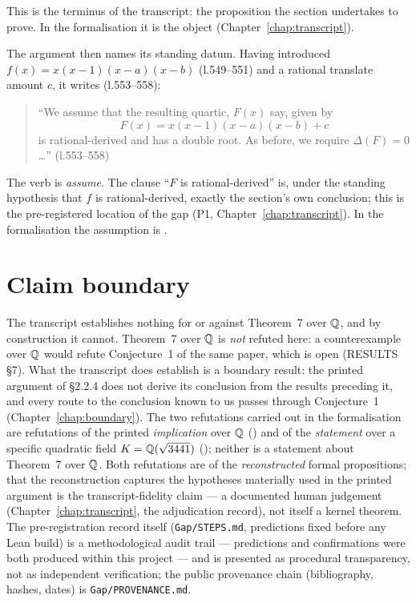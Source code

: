 This is the terminus of the transcript: the proposition the section undertakes to
prove.  In the formalisation it is the object 
(Chapter~\ref{chap:transcript}).

The argument then names its standing datum.  Having introduced
$f(x)=x(x-1)(x-a)(x-b)$ (l.549--551) and a rational translate amount $c$, it writes
(l.553--558):

\begin{quote}
``We assume that the resulting quartic, $F(x)$ say, given by
\[
F(x) = x(x-1)(x-a)(x-b) + c \tag{4}
\]
is rational-derived and has a double root. As before, we require $\Delta(F)=0$\dots''
\hfill (l.553--558)
\end{quote}

The verb is \emph{assume}.  The clause ``$F$ is rational-derived'' is, under the
standing hypothesis that $f$ is rational-derived, exactly the section's own
conclusion; this is the pre-registered location of the gap
(P1, Chapter~\ref{chap:transcript}).  In the formalisation the assumption is
.

\section{Claim boundary}

The transcript establishes nothing for or against Theorem~7 over $\mathbb{Q}$, and by
construction it cannot.  Theorem~7 over $\mathbb{Q}$ is \emph{not} refuted here: a
counterexample over $\mathbb{Q}$ would refute Conjecture~1 of the same paper, which is open
(RESULTS \S7).  What the transcript does establish is a boundary result: the printed
argument of \S2.2.4 does not derive its conclusion from the results preceding it, and
every route to the conclusion known to us passes through Conjecture~1
(Chapter~\ref{chap:boundary}).  The two refutations carried out in the formalisation
are refutations of the printed \emph{implication} over $\mathbb{Q}$
() and of the \emph{statement} over a specific
quadratic field $K=\mathbb{Q}(\sqrt{3441})$ (); neither
is a statement about Theorem~7 over $\mathbb{Q}$.  Both refutations are of the
\emph{reconstructed} formal propositions; that the reconstruction captures the hypotheses
materially used in the printed argument is the transcript-fidelity claim --- a documented
human judgement (Chapter~\ref{chap:transcript}, the adjudication record), not itself a
kernel theorem.  The pre-registration record itself (\texttt{Gap/STEPS.md},
predictions fixed before any Lean build) is a methodological audit trail ---
predictions and confirmations were both produced within this project --- and is
presented as procedural transparency, not as independent verification; the public
provenance chain (bibliography, hashes, dates) is \texttt{Gap/PROVENANCE.md}.

